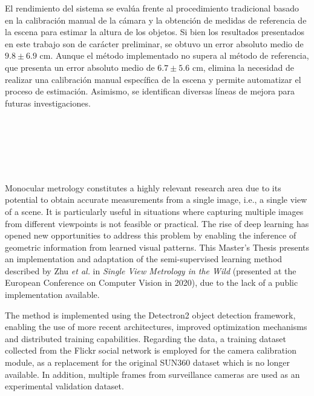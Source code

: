 El rendimiento del sistema se evalúa frente al procedimiento tradicional basado en la calibración manual de
la cámara y la obtención de medidas de referencia de la escena para estimar la altura de los objetos.
Si bien los resultados presentados en este trabajo son de carácter preliminar,
se obtuvo un error absoluto medio de $9.8\pm6.9$ cm.
Aunque el método implementado no supera al método de referencia, que presenta un error absoluto medio de $6.7\pm5.6$ cm,
elimina la necesidad de realizar una calibración manual específica de la escena y permite automatizar el proceso de estimación.
Asimismo, se identifican diversas líneas de mejora para futuras investigaciones.

\cleardoublepage


\thispagestyle{empty}


\begin{center}
{\large\bfseries \myTitleENG}\\
\end{center}
\begin{center}
\myName \\
\end{center}

\\

\\
Monocular metrology constitutes a highly relevant research area due to its potential to obtain accurate measurements from a single image, i.e.,
a single view of a scene. It is particularly useful in situations where capturing multiple images from different
viewpoints is not feasible or practical. The rise of deep learning has opened new opportunities to address this problem
by enabling the inference of geometric information from learned visual patterns.
This Master's Thesis presents an implementation and adaptation of the semi-supervised learning method described by Zhu \emph{et al.} in
\emph{Single View Metrology in the Wild} (presented at the European Conference on Computer Vision in 2020), due to the lack of a public implementation available.
\smallskip

The method is implemented using the Detectron2 object detection framework,
enabling the use of more recent architectures, improved optimization mechanisms and distributed training capabilities.
Regarding the data, a training dataset collected from the Flickr social network
is employed for the camera calibration module, as a replacement for the original SUN360 dataset which is no longer available.
In addition, multiple frames from surveillance cameras are used as an experimental validation dataset.
\smallskip

